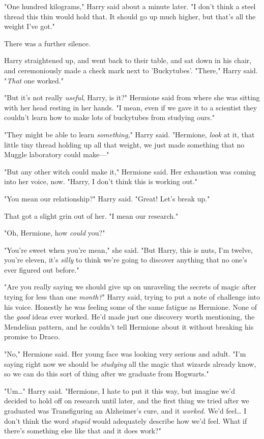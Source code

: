 "One hundred kilograms," Harry said about a minute later. "I don't think a 
steel thread this thin would hold that. It should go up much higher, but that's 
all the weight I've got."

There was a further silence.

Harry straightened up, and went back to their table, and sat down in his chair, 
and ceremoniously made a check mark next to 'Buckytubes'. "There," Harry said. 
"\emph{That} one worked."

"But it's not really \emph{useful}, Harry, is it?" Hermione said from where she 
was sitting with her head resting in her hands. "I mean, even if we gave it to 
a scientist they couldn't learn how to make lots of buckytubes from studying 
ours."

"They might be able to learn \emph{something,}" Harry said. "Hermione, 
\emph{look} at it, that little tiny thread holding up all that weight, we just 
made something that no Muggle laboratory could make---"

"But any other witch could make it," Hermione said. Her exhaustion was coming 
into her voice, now. "Harry, I don't think this is working out."

"You mean our relationship?" Harry said. "Great! Let's break up."

That got a slight grin out of her. "I mean our research."

"Oh, Hermione, how \emph{could} you?"

"You're sweet when you're mean," she said. "But Harry, this is nuts, I'm 
twelve, you're eleven, it's \emph{silly} to think we're going to discover 
anything that no one's ever figured out before."

"Are you really saying we should give up on unraveling the secrets of magic 
after trying for less than one\emph{ month?}" Harry said, trying to put a note 
of challenge into his voice. Honestly he was feeling some of the same fatigue 
as Hermione. None of the \emph{good} ideas ever worked. He'd made just one 
discovery worth mentioning, the Mendelian pattern, and he couldn't tell 
Hermione about it without breaking his promise to Draco.

"No," Hermione said. Her young face was looking very serious and adult. "I'm 
saying right now we should be \emph{studying} all the magic that wizards 
already know, so we can do this sort of thing after we graduate from Hogwarts."

"Um{\ldots}" Harry said. "Hermione, I hate to put it this way, but imagine we'd 
decided to hold off on research until later, and the first thing we tried after 
we graduated was Transfiguring an Alzheimer's cure, and it \emph{worked.} We'd 
feel{\ldots} I don't think the word \emph{stupid} would adequately describe how 
we'd feel. What if there's something else like that and it does work?"

